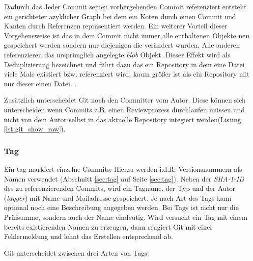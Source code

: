 Dadurch das Jeder Commit seinen vorhergehenden Commit referenziert entsteht ein
gerichteter azyklicher Graph bei dem ein Koten durch einen Commit und Kanten
durch Referenzen repräsentiert werden. Ein weiterer Vorteil dieser
Vorgehensweise ist das in dem Commit nicht immer alle enthaltenen Objekte neu
gespeichert werden sondern nur diejenigen die verändert wurden. Alle anderen
referenzieren das ursprünglich angelegte \textit{blob} Objekt. Dieser Effekt
wird als Deduplizierung bezeichnet und führt dazu das ein Repository in dem
eine Datei viele Male existiert bzw. referenziert wird, kaum größer ist als ein
Repository mit nur dieser einen Datei.
\cite[56-57]{gitops}.



Zusätzlich unterscheidet Git noch den Committer vom Autor. Diese können sich
unterscheiden wenn Commits z.B. einen Reviewprozess durchlaufen müssen und
nicht von dem Autor selbst in das aktuelle Repository integiert werden(Listing
\ref{lst:git_show_raw}).

\subsubsection{Tag}\label{sec:tagobject}
Ein \gls{tag} markiert einzelne Commits. Hierzu werden i.d.R. Versionsnummern
als Namen verwendet (Abschnitt \ref{sec:tag} auf Seite \ref{sec:tag}). Neben
der \textit{SHA-1-ID} des zu referenzierenden Commits, wird ein Tagname, der
Typ und der Autor (\textit{tagger}) mit Name und Mailadresse gespeichert. Je
nach Art des Tags kann optional noch eine Beschreibung angegeben werden. Bei
Tags ist nicht nur die Prüfsumme, sondern auch der Name eindeutig. Wird
versucht ein Tag mit einem bereits existierenden Namen zu erzeugen, dann
reagiert Git mit einer Fehlermeldung und lehnt das Erstellen entsprechend ab.

Git unterscheidet zwischen drei Arten von Tags:

